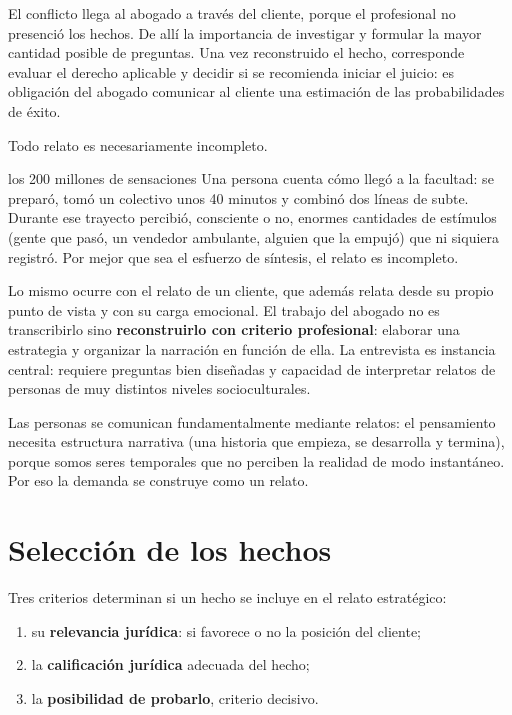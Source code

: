 \documentclass[12pt,oneside]{book}
\begin{document}
El conflicto llega al abogado a través del cliente, porque el profesional no presenció los hechos. De allí la importancia de investigar y formular la mayor cantidad posible de preguntas. Una vez reconstruido el hecho, corresponde evaluar el derecho aplicable y decidir si se recomienda iniciar el juicio: es obligación del abogado comunicar al cliente una estimación de las probabilidades de éxito.

Todo relato es necesariamente incompleto.

\begin{ejemplo}{los 200 millones de sensaciones}
Una persona cuenta cómo llegó a la facultad: se preparó, tomó un colectivo unos 40 minutos y combinó dos líneas de subte. Durante ese trayecto percibió, consciente o no, enormes cantidades de estímulos (gente que pasó, un vendedor ambulante, alguien que la empujó) que ni siquiera registró. Por mejor que sea el esfuerzo de síntesis, el relato es incompleto.
\end{ejemplo}

Lo mismo ocurre con el relato de un cliente, que además relata desde su propio punto de vista y con su carga emocional. El trabajo del abogado no es transcribirlo sino \textbf{reconstruirlo con criterio profesional}: elaborar una estrategia y organizar la narración en función de ella. La entrevista es instancia central: requiere preguntas bien diseñadas y capacidad de interpretar relatos de personas de muy distintos niveles socioculturales.

Las personas se comunican fundamentalmente mediante relatos: el pensamiento necesita estructura narrativa (una historia que empieza, se desarrolla y termina), porque somos seres temporales que no perciben la realidad de modo instantáneo. Por eso la demanda se construye como un relato.

\section{Selección de los hechos}

Tres criterios determinan si un hecho se incluye en el relato estratégico:

\begin{enumerate}
\item su \textbf{relevancia jurídica}: si favorece o no la posición del cliente;
\item la \textbf{calificación jurídica} adecuada del hecho;
\item la \textbf{posibilidad de probarlo}, criterio decisivo.
\end{enumerate}
\end{document}
